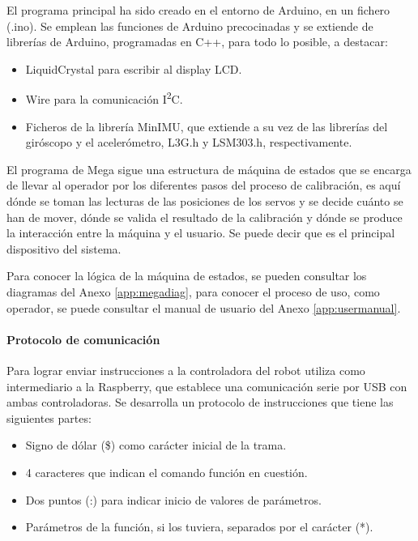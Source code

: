 El programa principal ha sido creado en el entorno de Arduino, en un fichero (.ino). Se emplean las funciones de Arduino precocinadas y se extiende de librerías de Arduino, programadas en C++, para todo lo posible, a destacar:
\begin{itemize}
  \item LiquidCrystal para escribir al display LCD.
  \item Wire para la comunicación  I\textsuperscript{2}C.
  \item Ficheros de la librería MinIMU, que extiende a su vez de las librerías del giróscopo y el acelerómetro, L3G.h y LSM303.h, respectivamente.
\end{itemize}

El programa de Mega sigue una estructura de máquina de estados que se encarga de llevar al operador por los diferentes pasos del proceso de calibración, es aquí dónde se toman las lecturas de las posiciones de los servos y se decide cuánto se han de mover, dónde se valida el resultado de la calibración y dónde se produce la interacción entre la máquina y el usuario. Se puede decir que es el principal dispositivo del sistema.

Para conocer la lógica de la máquina de estados, se pueden consultar los diagramas del Anexo \ref{app:megadiag}, para conocer el proceso de uso, como operador, se puede consultar el manual de usuario del Anexo \ref{app:usermanual}.

\paragraph{Protocolo de comunicación}

Para lograr enviar instrucciones a la controladora del robot utiliza como intermediario a la Raspberry, que establece una comunicación serie por USB con ambas controladoras. Se desarrolla un protocolo de instrucciones que tiene las siguientes partes:

\begin{itemize}
  \item Signo de dólar (\$) como carácter inicial de la trama.
  \item 4 caracteres que indican el comando función en cuestión.
  \item Dos puntos (:) para indicar inicio de valores de parámetros.
  \item Parámetros de la función, si los tuviera, separados por el carácter (*).
\end{itemize}

